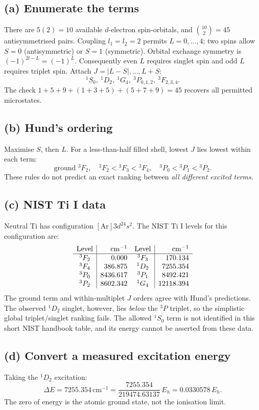 \subsection*{(a) Enumerate the terms}
There are \(5(2)=10\) available \(d\)-electron spin-orbitals,
and \(\binom{10}{2}=45\) antisymmetrised pairs.
Coupling \(l_1=l_2=2\) permits \(L=0,\ldots,4\);
two spins allow \(S=0\) (antisymmetric) or \(S=1\)
(symmetric). Orbital exchange symmetry is
\((-1)^{2l-L}=(-1)^L\). Consequently even \(L\)
requires singlet spin and odd \(L\) requires
triplet spin. Attach \(J=|L-S|,\ldots,L+S\):
\[
\boxed{
{}^1S_0,\ {}^1D_2,\ {}^1G_4,\
{}^3P_{0,1,2},\ {}^3F_{2,3,4}.}
\]
The check
\(1+5+9+(1+3+5)+(5+7+9)=45\)
recovers all permitted microstates.

\subsection*{(b) Hund's ordering}
Maximise \(S\), then \(L\). For a less-than-half
filled shell, lowest \(J\) lies lowest within
each term:
\[
\boxed{\text{ground }{}^3F_2,\quad
{}^3F_2<{}^3F_3<{}^3F_4,\quad
{}^3P_0<{}^3P_1<{}^3P_2.}
\]
These rules do not predict an exact ranking
between \emph{all different excited terms}.

\subsection*{(c) NIST Ti I data}
Neutral Ti has configuration
\([\mathrm{Ar}]3d^24s^2\).
The NIST Ti I levels for this configuration are:
\[
\begin{array}{c|r@{\quad}c|r}
\text{Level}&\mathrm{cm}^{-1}&\text{Level}&\mathrm{cm}^{-1}\\\hline
{}^3F_2&0.000&{}^3F_3&170.134\\
{}^3F_4&386.875&{}^1D_2&7255.354\\
{}^3P_0&8436.617&{}^3P_1&8492.421\\
{}^3P_2&8602.342&{}^1G_4&12118.394
\end{array}
\]
The ground term and within-multiplet \(J\) orders
agree with Hund's predictions. The observed
\({}^1D_2\) singlet, however, lies \emph{below}
the \({}^3P\) triplet, so the simplistic global
triplet/singlet ranking fails. The allowed
\({}^1S_0\) term is not identified in this
short NIST handbook table, and its energy
cannot be asserted from these data.

\subsection*{(d) Convert a measured excitation energy}
Taking the \({}^1D_2\) excitation:
\[
\boxed{\Delta E=7255.354\,\mathrm{cm}^{-1}
=\frac{7255.354}{219474.63137}\,E_h
=0.0330578\,E_h}.
\]
The zero of energy is the atomic ground state,
not the ionisation limit.
